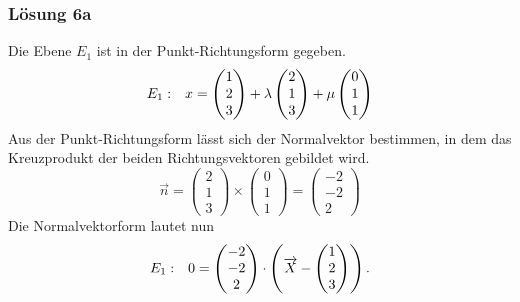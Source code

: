 \subsubsection{Lösung 6a}

Die Ebene $\displaystyle E_{1}$ ist in der Punkt-Richtungsform gegeben. 
\begin{equation*}
	\begin{array}{ r l }
		E_{1} : & x=\begin{pmatrix}
			1\\
			2\\
			3
		\end{pmatrix} +\lambda \begin{pmatrix}
			2\\
			1\\
			3
		\end{pmatrix} +\mu \begin{pmatrix}
			0\\
			1\\
			1
		\end{pmatrix}
	\end{array}
\end{equation*}
Aus der Punkt-Richtungsform lässt sich der Normalvektor bestimmen, in dem das Kreuzprodukt der beiden Richtungsvektoren gebildet wird.
\begin{equation*}
	\vec{n} =\begin{pmatrix}
		2\\
		1\\
		3
	\end{pmatrix} \times \begin{pmatrix}
		0\\
		1\\
		1
	\end{pmatrix} =\begin{pmatrix}
		-2\\
		-2\\
		2
	\end{pmatrix}
\end{equation*}
Die Normalvektorform lautet nun
\begin{equation*}
	\begin{array}{ r l }
		E_{1} : & 0=\begin{pmatrix}
			-2\\
			-2\\
			2
		\end{pmatrix} \cdotp \left(\vec{X} -\begin{pmatrix}
			1\\
			2\\
			3
		\end{pmatrix}\right)\text{.}
	\end{array}
\end{equation*}
